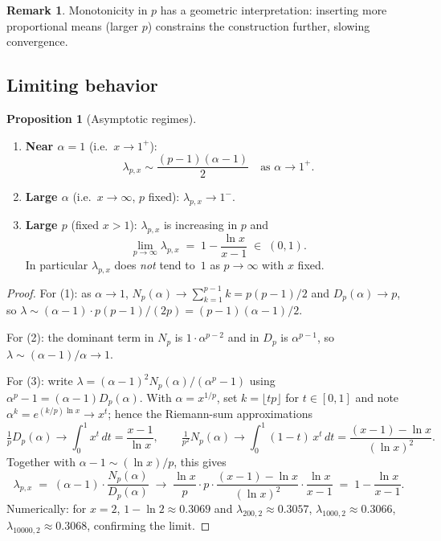 \documentclass[11pt,a4paper]{article}
\theoremstyle{definition}
\newtheorem{proposition}{Proposition}[section]
\newtheorem{remark}{Remark}[section]
\begin{document}
\begin{remark}
Monotonicity in $p$ has a geometric interpretation: inserting more proportional means (larger $p$) constrains the construction further, slowing convergence.
\end{remark}

\subsection{Limiting behavior}

\begin{proposition}[Asymptotic regimes]
\label{prop:limits}
\mbox{}
\begin{enumerate}
  \item \textbf{Near $\alpha = 1$} (i.e.\ $x \to 1^+$):
  \[
    \lambda_{p,x} \sim \frac{(p-1)(\alpha - 1)}{2} \quad \text{as } \alpha \to 1^+.
  \]
  \item \textbf{Large $\alpha$} (i.e.\ $x \to \infty$, $p$ fixed): $\lambda_{p,x} \to 1^-$.
  \item \textbf{Large $p$} (fixed $x > 1$): $\lambda_{p,x}$ is increasing in $p$ and
  \[
    \lim_{p \to \infty} \lambda_{p,x} \;=\; 1 - \frac{\ln x}{x - 1}
     \;\in\; (0, 1).
  \]
  In particular $\lambda_{p,x}$ does \emph{not} tend to~$1$ as $p \to \infty$ with $x$ fixed.
\end{enumerate}
\end{proposition}

\begin{proof}
For (1): as $\alpha \to 1$, $N_p(\alpha) \to \sum_{k=1}^{p-1}k = p(p-1)/2$ and $D_p(\alpha) \to p$, so $\lambda \sim (\alpha-1) \cdot p(p-1)/(2p) = (p-1)(\alpha-1)/2$.

For (2): the dominant term in $N_p$ is $1 \cdot \alpha^{p-2}$ and in $D_p$ is $\alpha^{p-1}$, so $\lambda \sim (\alpha-1)/\alpha \to 1$.

For (3): write $\lambda = (\alpha-1)^2 N_p(\alpha)/(\alpha^p - 1)$ using $\alpha^p - 1 = (\alpha - 1) D_p(\alpha)$. With $\alpha = x^{1/p}$, set $k = \lfloor tp \rfloor$ for $t \in [0,1]$ and note $\alpha^k = e^{(k/p)\ln x} \to x^t$; hence the Riemann-sum approximations
\[
  \tfrac{1}{p} D_p(\alpha) \longrightarrow \int_0^1 x^t \,dt
  = \frac{x-1}{\ln x},
  \qquad
  \tfrac{1}{p^2} N_p(\alpha) \longrightarrow \int_0^1 (1-t)\, x^t \,dt
  = \frac{(x-1) - \ln x}{(\ln x)^2}.
\]
Together with $\alpha - 1 \sim (\ln x)/p$, this gives
\[
  \lambda_{p,x}
  \;=\;
  (\alpha-1) \cdot \frac{N_p(\alpha)}{D_p(\alpha)}
  \;\longrightarrow\;
  \frac{\ln x}{p} \cdot p \cdot \frac{(x-1) - \ln x}{(\ln x)^2} \cdot \frac{\ln x}{x-1}
  \;=\;
  1 - \frac{\ln x}{x-1}.
\]
Numerically: for $x = 2$, $1 - \ln 2 \approx 0.3069$ and $\lambda_{200,2} \approx 0.3057$, $\lambda_{1000,2} \approx 0.3066$, $\lambda_{10000,2} \approx 0.3068$, confirming the limit.
\end{proof}
\end{document}
